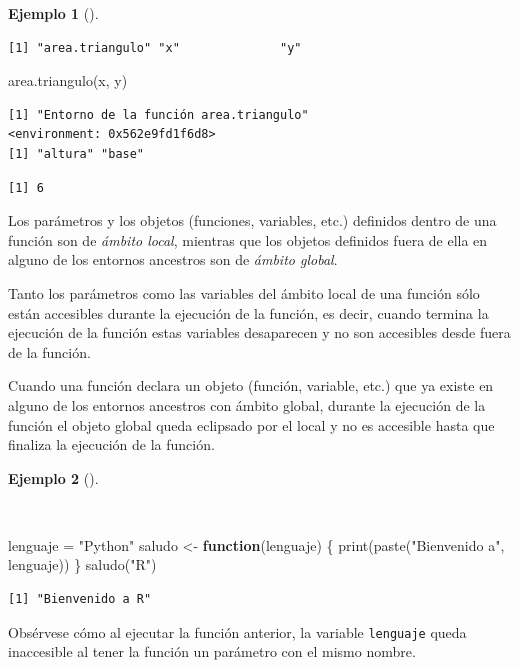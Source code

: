 \documentclass[
  spanish,
  a4paper,
]{scrreport}
\newenvironment{Shaded}{\begin{snugshade}}{\end{snugshade}}
\newcommand{\ControlFlowTok}[1]{\textcolor[rgb]{0.00,0.23,0.31}{\textbf{#1}}}
\newcommand{\FunctionTok}[1]{\textcolor[rgb]{0.28,0.35,0.67}{#1}}
\newcommand{\NormalTok}[1]{\textcolor[rgb]{0.00,0.23,0.31}{#1}}
\newcommand{\OtherTok}[1]{\textcolor[rgb]{0.00,0.23,0.31}{#1}}
\newcommand{\StringTok}[1]{\textcolor[rgb]{0.13,0.47,0.30}{#1}}
\theoremstyle{definition}
\theoremstyle{definition}
\newtheorem{example}{Ejemplo}[chapter]
\theoremstyle{remark}
\begin{document}
\begin{example}[]
\begin{verbatim}
[1] "area.triangulo" "x"              "y"             
\end{verbatim}

\begin{Shaded}
\begin{Highlighting}[]
\FunctionTok{area.triangulo}\NormalTok{(x, y)}
\end{Highlighting}
\end{Shaded}

\begin{verbatim}
[1] "Entorno de la función area.triangulo"
<environment: 0x562e9fd1f6d8>
[1] "altura" "base"  
\end{verbatim}

\begin{verbatim}
[1] 6
\end{verbatim}

\end{example}

Los parámetros y los objetos (funciones, variables, etc.) definidos
dentro de una función son de \emph{ámbito local}, mientras que los
objetos definidos fuera de ella en alguno de los entornos ancestros son
de \emph{ámbito global}.

Tanto los parámetros como las variables del ámbito local de una función
sólo están accesibles durante la ejecución de la función, es decir,
cuando termina la ejecución de la función estas variables desaparecen y
no son accesibles desde fuera de la función.

Cuando una función declara un objeto (función, variable, etc.) que ya
existe en alguno de los entornos ancestros con ámbito global, durante la
ejecución de la función el objeto global queda eclipsado por el local y
no es accesible hasta que finaliza la ejecución de la función.

\begin{example}[]\protect\hypertarget{exm-eclise-variables-globales-por-locales}{}\label{exm-eclise-variables-globales-por-locales}

~

\begin{Shaded}
\begin{Highlighting}[]
\NormalTok{lenguaje }\OtherTok{=} \StringTok{"Python"}
\NormalTok{saludo }\OtherTok{\textless{}{-}} \ControlFlowTok{function}\NormalTok{(lenguaje) \{}
  \FunctionTok{print}\NormalTok{(}\FunctionTok{paste}\NormalTok{(}\StringTok{"Bienvenido a"}\NormalTok{, lenguaje))  }
\NormalTok{\}}
\FunctionTok{saludo}\NormalTok{(}\StringTok{"R"}\NormalTok{)}
\end{Highlighting}
\end{Shaded}

\begin{verbatim}
[1] "Bienvenido a R"
\end{verbatim}

Obsérvese cómo al ejecutar la función anterior, la variable
\texttt{lenguaje} queda inaccesible al tener la función un parámetro con
el mismo nombre.

\end{example}
\end{document}
